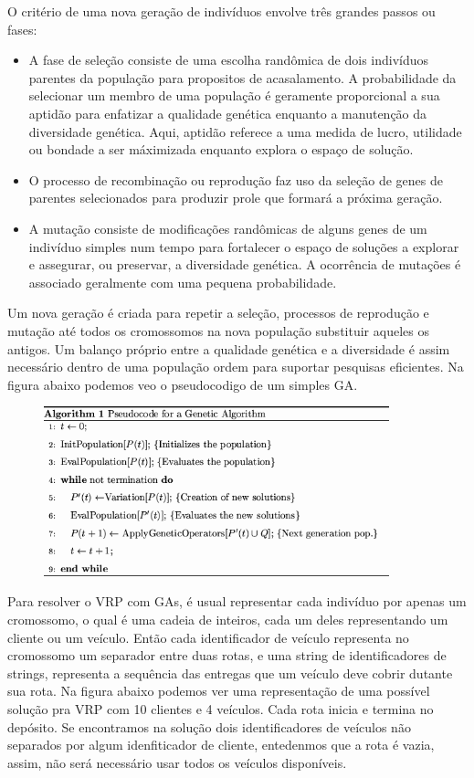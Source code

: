 \documentclass[a4paper, 12pt]{article}
\begin{document}
 O critério de uma nova geração de indivíduos envolve três grandes passos ou fases:

\begin{itemize}
\item A fase de seleção consiste de uma escolha randômica de dois indivíduos parentes da população
para propositos de acasalamento. A probabilidade da selecionar um membro de uma população é
geramente proporcional a sua aptidão para enfatizar a qualidade genética enquanto a manutenção da
diversidade genética. Aqui, aptidão referece a uma medida de lucro, utilidade ou bondade a ser
máximizada enquanto explora o espaço de solução.
\item O processo de recombinação ou reprodução faz uso da seleção de genes de parentes selecionados
para produzir prole que formará a próxima geração.
\item A mutação consiste de modificações randômicas de alguns genes de um indivíduo simples num
tempo para fortalecer o espaço de soluções a explorar e assegurar, ou preservar, a diversidade
genética. A ocorrência de mutações é associado geralmente com uma pequena probabilidade.
\end{itemize}

 Um nova geração é criada para repetir a seleção, processos de reprodução e mutação até todos os
cromossomos na nova população substituir aqueles os antigos. Um balanço próprio entre a qualidade
genética e a diversidade é assim necessário dentro de uma população  ordem para suportar pesquisas
eficientes. Na figura abaixo podemos veo o pseudocodigo de um simples GA.

\begin{figure}[!ht]
\centering
\includegraphics[width=10cm]{.images/ga-pseudocode.png}
\end{figure}

 Para resolver o VRP com GAs, é usual representar cada indivíduo por apenas um cromossomo, o qual é
uma cadeia de inteiros, cada um deles representando um cliente ou um veículo. Então cada
identificador de veículo  representa no cromossomo um separador entre duas rotas, e uma string de
identificadores de strings, representa a sequência das entregas que um veículo deve cobrir dutante
sua rota. Na figura abaixo podemos ver uma representação de uma possível solução pra VRP com 10
clientes e 4 veículos. Cada rota inicia e termina no depósito. Se encontramos na solução dois
identificadores de veículos não separados por algum idenfiticador de cliente, entedenmos que a rota
é vazia, assim, não será necessário usar todos os veículos disponíveis.
\end{document}
